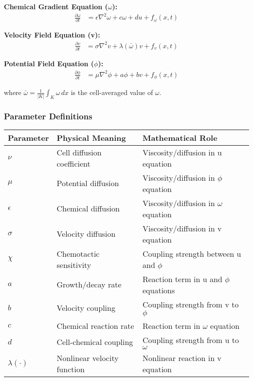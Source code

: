 \textbf{Chemical Gradient Equation ($\omega$):}
\begin{align}
\frac{\partial \omega}{\partial t} &= \epsilon \nabla^2 \omega + c \omega + d u + f_\omega(x,t)
\end{align}

\textbf{Velocity Field Equation (v):}
\begin{align}
\frac{\partial v}{\partial t} &= \sigma \nabla^2 v + \lambda(\bar{\omega}) v + f_v(x,t)
\end{align}

\textbf{Potential Field Equation ($\phi$):}
\begin{align}
\frac{\partial \phi}{\partial t} &= \mu \nabla^2 \phi + a \phi + b v + f_\phi(x,t)
\end{align}

where $\bar{\omega} = \frac{1}{|K|} \int_K \omega \, dx$ is the cell-averaged value of $\omega$.

\subsubsection{Parameter Definitions}

\begin{longtable}{|p{2cm}|p{3cm}|p{8cm}|}
\hline
\textbf{Parameter} & \textbf{Physical Meaning} & \textbf{Mathematical Role} \\
\hline
\endhead

$\nu$ & Cell diffusion coefficient & Viscosity/diffusion in u equation \\
\hline

$\mu$ & Potential diffusion & Viscosity/diffusion in $\phi$ equation \\
\hline

$\epsilon$ & Chemical diffusion & Viscosity/diffusion in $\omega$ equation \\
\hline

$\sigma$ & Velocity diffusion & Viscosity/diffusion in v equation \\
\hline

$\chi$ & Chemotactic sensitivity & Coupling strength between u and $\phi$ \\
\hline

$a$ & Growth/decay rate & Reaction term in u and $\phi$ equations \\
\hline

$b$ & Velocity coupling & Coupling strength from v to $\phi$ \\
\hline

$c$ & Chemical reaction rate & Reaction term in $\omega$ equation \\
\hline

$d$ & Cell-chemical coupling & Coupling strength from u to $\omega$ \\
\hline

$\lambda(\cdot)$ & Nonlinear velocity function & Nonlinear reaction in v equation \\
\hline

\end{longtable}

